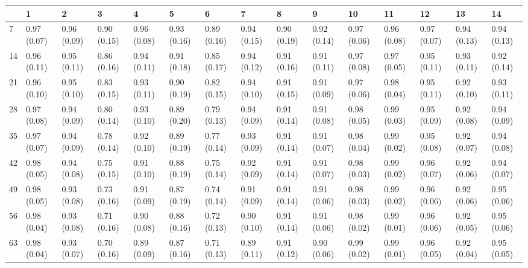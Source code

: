 \begin{tabular}{lllllllllllllll}
\toprule
{} &            1 &            2 &            3 &            4 &            5 &            6 &            7 &            8 &            9 &           10 &           11 &           12 &           13 &           14 \\
\midrule
7   &  0.97 (0.07) &  0.96 (0.09) &  0.90 (0.15) &  0.96 (0.08) &  0.93 (0.16) &  0.89 (0.16) &  0.94 (0.15) &  0.90 (0.19) &  0.92 (0.14) &  0.97 (0.06) &  0.96 (0.08) &  0.97 (0.07) &  0.94 (0.13) &  0.94 (0.13) \\
14  &  0.96 (0.11) &  0.95 (0.11) &  0.86 (0.16) &  0.94 (0.11) &  0.91 (0.18) &  0.85 (0.17) &  0.94 (0.12) &  0.91 (0.16) &  0.91 (0.11) &  0.97 (0.08) &  0.97 (0.05) &  0.95 (0.11) &  0.93 (0.11) &  0.92 (0.14) \\
21  &  0.96 (0.10) &  0.95 (0.10) &  0.83 (0.15) &  0.93 (0.11) &  0.90 (0.19) &  0.82 (0.15) &  0.94 (0.10) &  0.91 (0.15) &  0.91 (0.09) &  0.97 (0.06) &  0.98 (0.04) &  0.95 (0.11) &  0.92 (0.10) &  0.93 (0.11) \\
28  &  0.97 (0.08) &  0.94 (0.09) &  0.80 (0.14) &  0.93 (0.10) &  0.89 (0.20) &  0.79 (0.13) &  0.94 (0.09) &  0.91 (0.14) &  0.91 (0.08) &  0.98 (0.05) &  0.99 (0.03) &  0.95 (0.09) &  0.92 (0.08) &  0.94 (0.09) \\
35  &  0.97 (0.07) &  0.94 (0.09) &  0.78 (0.14) &  0.92 (0.10) &  0.89 (0.19) &  0.77 (0.14) &  0.93 (0.09) &  0.91 (0.14) &  0.91 (0.07) &  0.98 (0.04) &  0.99 (0.02) &  0.95 (0.08) &  0.92 (0.07) &  0.94 (0.08) \\
42  &  0.98 (0.05) &  0.94 (0.08) &  0.75 (0.15) &  0.91 (0.10) &  0.88 (0.19) &  0.75 (0.14) &  0.92 (0.09) &  0.91 (0.14) &  0.91 (0.07) &  0.98 (0.03) &  0.99 (0.02) &  0.96 (0.07) &  0.92 (0.06) &  0.94 (0.07) \\
49  &  0.98 (0.05) &  0.93 (0.08) &  0.73 (0.16) &  0.91 (0.09) &  0.87 (0.19) &  0.74 (0.14) &  0.91 (0.09) &  0.91 (0.14) &  0.91 (0.06) &  0.98 (0.03) &  0.99 (0.02) &  0.96 (0.06) &  0.92 (0.06) &  0.95 (0.06) \\
56  &  0.98 (0.04) &  0.93 (0.08) &  0.71 (0.16) &  0.90 (0.08) &  0.88 (0.16) &  0.72 (0.13) &  0.90 (0.10) &  0.91 (0.14) &  0.91 (0.06) &  0.98 (0.02) &  0.99 (0.01) &  0.96 (0.06) &  0.92 (0.05) &  0.95 (0.06) \\
63  &  0.98 (0.04) &  0.93 (0.07) &  0.70 (0.16) &  0.89 (0.09) &  0.87 (0.16) &  0.71 (0.13) &  0.89 (0.11) &  0.91 (0.12) &  0.90 (0.06) &  0.99 (0.02) &  0.99 (0.01) &  0.96 (0.05) &  0.92 (0.04) &  0.95 (0.05) \\

\end{tabular}
